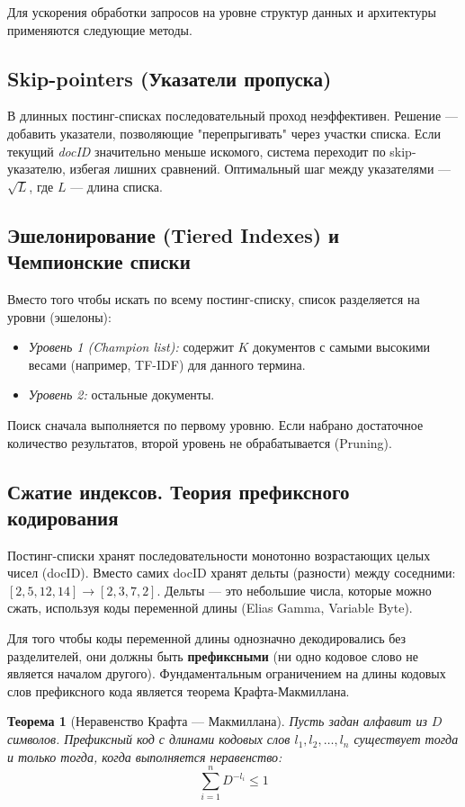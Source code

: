 \documentclass[12pt,a4paper]{article}
\newtheorem{theorem}{Теорема}
\begin{document}
Для ускорения обработки запросов на уровне структур данных и архитектуры применяются следующие методы.

\subsection{Skip-pointers (Указатели пропуска)}
В длинных постинг-списках последовательный проход неэффективен. Решение --- добавить указатели, позволяющие "перепрыгивать" через участки списка. Если текущий \textit{docID} значительно меньше искомого, система переходит по skip-указателю, избегая лишних сравнений. Оптимальный шаг между указателями --- $\sqrt{L}$, где $L$ --- длина списка.

\subsection{Эшелонирование (Tiered Indexes) и Чемпионские списки}
Вместо того чтобы искать по всему постинг-списку, список разделяется на уровни (эшелоны):
\begin{itemize}
    \item \textit{Уровень 1 (Champion list):} содержит $K$ документов с самыми высокими весами (например, TF-IDF) для данного термина.
    \item \textit{Уровень 2:} остальные документы.
\end{itemize}
Поиск сначала выполняется по первому уровню. Если набрано достаточное количество результатов, второй уровень не обрабатывается (Pruning).

\subsection{Сжатие индексов. Теория префиксного кодирования}
Постинг-списки хранят последовательности монотонно возрастающих целых чисел (docID). Вместо самих docID хранят дельты (разности) между соседними:
$[2, 5, 12, 14] \rightarrow [2, 3, 7, 2]$. Дельты --- это небольшие числа, которые можно сжать, используя коды переменной длины (Elias Gamma, Variable Byte).

Для того чтобы коды переменной длины однозначно декодировались без разделителей, они должны быть \textbf{префиксными} (ни одно кодовое слово не является началом другого). Фундаментальным ограничением на длины кодовых слов префиксного кода является теорема Крафта-Макмиллана.

\begin{theorem}[Неравенство Крафта --- Макмиллана]
Пусть задан алфавит из $D$ символов. Префиксный код с длинами кодовых слов $l_1, l_2, \dots, l_n$ существует тогда и только тогда, когда выполняется неравенство:
$$ \sum_{i=1}^{n} D^{-l_i} \le 1 $$
\end{theorem}
\end{document}
